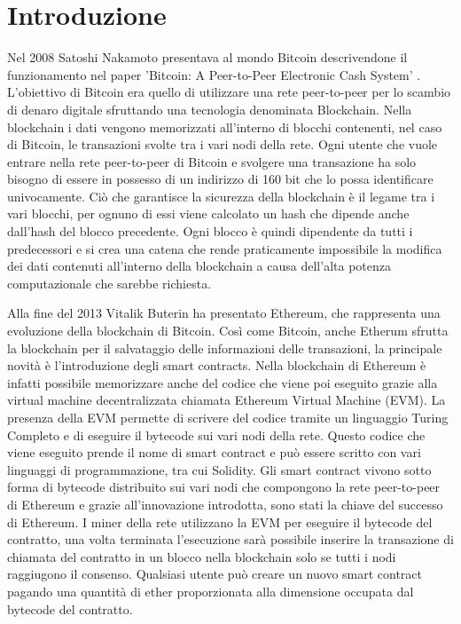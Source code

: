 \documentclass[12pt]{report}
\begin{document}
\newpage\null\thispagestyle{empty}\newpage

\tableofcontents

\chapter{Introduzione}
\fontsize{13pt}{15pt}\selectfont

Nel 2008 Satoshi Nakamoto presentava al mondo Bitcoin descrivendone il funzionamento nel paper 'Bitcoin: A Peer-to-Peer Electronic Cash System' \cite{BitcoinWhitePaper}.
L'obiettivo di Bitcoin era quello di utilizzare una rete peer-to-peer per lo scambio di denaro digitale sfruttando una tecnologia denominata Blockchain. 
Nella blockchain i dati vengono memorizzati all'interno di blocchi contenenti, nel caso di Bitcoin, le transazioni svolte tra i vari nodi della rete.
Ogni utente che vuole entrare nella rete peer-to-peer di Bitcoin e svolgere una transazione ha solo bisogno di essere in possesso di un  indirizzo di 160 bit che lo possa identificare univocamente.
\newline
Ciò che garantisce la sicurezza della blockchain è il legame tra i vari blocchi, per ognuno di essi viene calcolato un hash che dipende anche dall'hash del blocco precedente.
Ogni blocco è quindi dipendente da tutti i predecessori e si crea una catena che rende praticamente impossibile la modifica dei dati contenuti all'interno della blockchain a causa dell'alta potenza computazionale che sarebbe richiesta.

Alla fine del 2013 Vitalik Buterin ha presentato Ethereum, che rappresenta una evoluzione della blockchain di Bitcoin.
\newline 
Così come Bitcoin, anche Etherum sfrutta la blockchain per il salvataggio delle informazioni delle transazioni, la principale novità è l'introduzione degli smart contracts.
Nella blockchain di Ethereum è infatti possibile memorizzare anche del codice che viene poi eseguito grazie alla virtual machine decentralizzata chiamata Ethereum Virtual Machine (EVM).
La presenza della EVM permette di scrivere del codice tramite un linguaggio Turing Completo e di eseguire il bytecode sui vari nodi della rete. Questo codice che viene eseguito prende il nome di smart contract e può essere scritto con vari linguaggi di programmazione, tra cui Solidity.
\newline
Gli smart contract vivono sotto forma di bytecode distribuito sui vari nodi che compongono la rete peer-to-peer di Ethereum e grazie all'innovazione introdotta, sono stati la chiave del successo di Ethereum.
I miner della rete utilizzano la EVM per eseguire il bytecode del contratto, una volta terminata l'esecuzione sarà possibile inserire la transazione di chiamata del contratto in un blocco nella blockchain solo se tutti i nodi raggiugono il consenso.
Qualsiasi utente può creare un nuovo smart contract pagando una quantità di ether proporzionata alla dimensione occupata dal bytecode del contratto.
\end{document}
